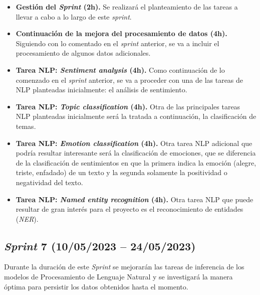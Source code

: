 \begin{itemize}

    \item \textbf{Gestión del \textit{Sprint} (2h).} Se realizará el planteamiento de las tareas a llevar a cabo a lo largo de este \textit{sprint}.

    \item \textbf{Continuación de la mejora del procesamiento de datos (4h).} Siguiendo con lo comentado en el \textit{sprint} anterior, se va a incluir el procesamiento de algunos datos adicionales.

    \item \textbf{Tarea NLP: \textit{Sentiment analysis} (4h).} Como continuación de lo comenzado en el \textit{sprint} anterior, se va a proceder con una de las tareas de NLP planteadas inicialmente: el análisis de sentimiento.

    \item \textbf{Tarea NLP: \textit{Topic classification} (4h).} Otra de las principales tareas NLP planteadas inicialmente será la tratada a continuación, la clasificación de temas.

    \item \textbf{Tarea NLP: \textit{Emotion classification} (4h).} Otra tarea NLP adicional que podría resultar interesante será la clasificación de emociones, que se diferencia de la clasificación de sentimientos en que la primera indica la emoción (alegre, triste, enfadado) de un texto y la segunda solamente la positividad o negatividad del texto.

    \item \textbf{Tarea NLP: \textit{Named entity recognition} (4h).} Otra tarea NLP que puede resultar de gran interés para el proyecto es el reconocimiento de entidades (\textit{NER}).

\end{itemize}



\subsection{\textit{Sprint} 7 (10/05/2023 -- 24/05/2023)}

Durante la duración de este \textit{Sprint} se mejorarán las tareas de inferencia de los modelos de Procesamiento de Lenguaje Natural y se investigará la manera óptima para persistir los datos obtenidos hasta el momento.

